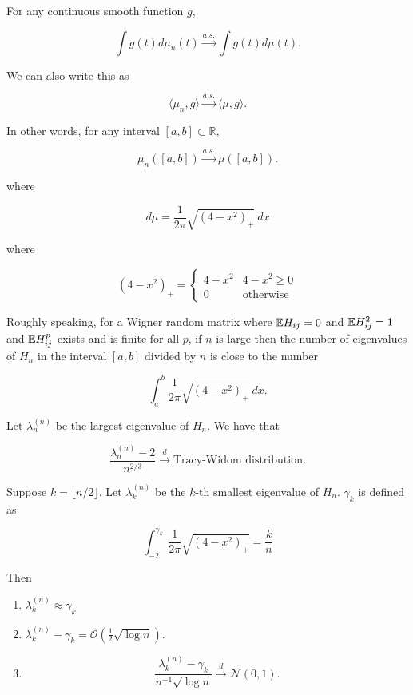 \begin{proposition}
For any continuous smooth function \(g\), 

\[
\int g(t) d \mu_n(t) \xrightarrow{a.s.} \int g(t) d \mu(t).
\]

We can also write this as 

\[
\langle \mu_n, g \rangle \xrightarrow{a.s.} \langle \mu, g \rangle.
\]

In other words, for any interval \([a,b] \subset \mathbb{R}\), 

\[
\mu_n([a,b]) \xrightarrow{a.s.} \mu([a,b]).
\]

where

\[
d \mu = \frac{1}{2\pi} \sqrt{(4-x^2)_+} \ dx
\]

where

\[
(4-x^2)_+ = \begin{cases}
4- x^2 & 4-x^2 \geq 0 \\
0 & \text{otherwise}
\end{cases}
\]

Roughly speaking, for a Wigner random matrix where \(\mathbb{E} H_{ij} = 0\) and \(\mathbb{E} H_{ij}^2 =1\) and \(\mathbb{E} H_{ij}^p\) exists and is finite for all \(p\), if \(n\) is large then the number of eigenvalues of \(H_n\) in the interval \([a,b]\) divided by \(n\) is close to the number

\[
\int_a^b \frac{1}{2\pi} \sqrt{(4-x^2)_+} \ dx.
\]

\end{proposition}

Let \(\lambda_n^{(n)}\) be the largest eigenvalue of \(H_n\). We have that 

\[
\frac{\lambda_n^{(n)} - 2 }{n^{2/3}} \xrightarrow{d} \text{Tracy-Widom distribution.}
\]

\begin{proposition}

Suppose \(k = \lfloor n/2 \rfloor\). Let \(\lambda_k^{(n)}\) be the \(k\)-th smallest eigenvalue of \(H_n\). \(\gamma_k\) is defined as 

\[
\int_{-2}^{\gamma_k} \frac{1}{2\pi} \sqrt{(4-x^2)_+} = \frac{k}{n}
\]

Then

\begin{enumerate}[(1)]

\item \(\lambda_k^{(n)} \approx\gamma_k\)

\item \(\lambda_k^{(n)} - \gamma_k = \mathcal{O} \left( \frac{1}{2} \sqrt{\log n} \right)\).

\item

\[
\frac{\lambda_k^{(n)} - \gamma_k}{n^{-1} \sqrt{ \log n}} \xrightarrow{d} \mathcal{N}(0, 1).
\]

\end{enumerate}

\end{proposition}

